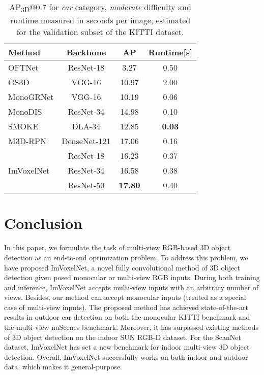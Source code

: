 \documentclass[10pt,twocolumn,letterpaper]{article}
\begin{document}
\begin{table}[!h]
\centering \small
    \begingroup \setlength{\tabcolsep}{2pt}
    \begin{tabular}{l|c|c|c}
    \hline
    Method & Backbone & AP & Runtime[s] \\ \hline
    OFTNet\cite{roddick2018orthographic} & ResNet-18 & \phantom{0}3.27 & 0.50 \\
    GS3D\cite{li2019gs3d} & VGG-16 & 10.97 & 2.00 \\
    MonoGRNet\cite{qin2019monogrnet} & VGG-16 & 10.19 & 0.06 \\
    MonoDIS\cite{simonelli2020disentangling} & ResNet-34 & 14.98 & 0.10 \\
    SMOKE\cite{liu2020smoke} & DLA-34 & 12.85 & \textbf{0.03} \\
    M3D-RPN\cite{brazil2019m3drpn} & DenseNet-121 & 17.06 & 0.16 \\
    \multirow[l]{3}{*}{ImVoxelNet} & ResNet-18 & 16.23 & 0.37 \\
    & ResNet-34 & 16.58 & 0.38 \\
    & ResNet-50 & \textbf{17.80} & 0.40 \\ \hline
    \end{tabular} \endgroup
    \caption{AP\textsubscript{3D}@0.7 for \textit{car} category, \textit{moderate} difficulty and runtime measured in seconds per image, estimated for the validation subset of the KITTI dataset.}
\label{tab:performance}
\end{table}

\section{Conclusion}

In this paper, we formulate the task of multi-view RGB-based 3D object detection as an end-to-end optimization problem. To address this problem, we have proposed ImVoxelNet, a novel fully convolutional method of 3D object detection given posed monocular or multi-view RGB inputs. During both training and inference, ImVoxelNet accepts multi-view inputs with an arbitrary number of views. Besides, our method can accept monocular inputs (treated as a special case of multi-view inputs). The proposed method has achieved state-of-the-art results in outdoor car detection on both the monocular KITTI benchmark and the multi-view nuScenes benchmark. Moreover, it has surpassed existing methods of 3D object detection on the indoor SUN RGB-D dataset. For the ScanNet dataset, ImVoxelNet has set a new benchmark for indoor multi-view 3D object detection. Overall, ImVoxelNet successfully works on both indoor and outdoor data, which makes it general-purpose.
\end{document}
